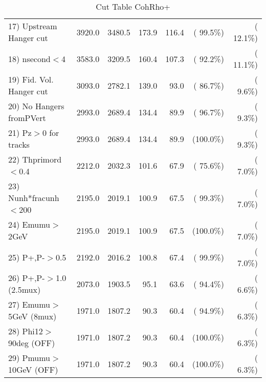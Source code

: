 \begin{table}[h!]
\begin{tabular}{||l||r|r|r|r|r|r||}
 17) Upstream Hanger cut  &       3920.0 &       3480.5 &        173.9 &        116.4 & ( 99.5\%) & ( 12.1\%) \\
 18) nsecond$<$4          &       3583.0 &       3209.5 &        160.4 &        107.3 & ( 92.2\%) & ( 11.1\%) \\
 19) Fid. Vol. Hanger cut &       3093.0 &       2782.1 &        139.0 &         93.0 & ( 86.7\%) & (  9.6\%) \\
 20) No Hangers fromPVert &       2993.0 &       2689.4 &        134.4 &         89.9 & ( 96.7\%) & (  9.3\%) \\
 21) Pz$>$0 for tracks    &       2993.0 &       2689.4 &        134.4 &         89.9 & (100.0\%) & (  9.3\%) \\
 22) Thprimord$<$0.4      &       2212.0 &       2032.3 &        101.6 &         67.9 & ( 75.6\%) & (  7.0\%) \\
 23) Nunh*fracunh$<$200   &       2195.0 &       2019.1 &        100.9 &         67.5 & ( 99.3\%) & (  7.0\%) \\
 24) Emumu$>$2GeV         &       2195.0 &       2019.1 &        100.9 &         67.5 & (100.0\%) & (  7.0\%) \\
 25) P+,P-$>$0.5          &       2192.0 &       2016.2 &        100.8 &         67.4 & ( 99.9\%) & (  7.0\%) \\
 26) P+,P-$>$1.0 (2.5mux) &       2073.0 &       1903.5 &         95.1 &         63.6 & ( 94.4\%) & (  6.6\%) \\
 27) Emumu$>$5GeV  (8mux) &       1971.0 &       1807.2 &         90.3 &         60.4 & ( 94.9\%) & (  6.3\%) \\
 28) Phi12$>$90deg  (OFF) &       1971.0 &       1807.2 &         90.3 &         60.4 & (100.0\%) & (  6.3\%) \\
 29) Pmumu$>$10GeV  (OFF) &       1971.0 &       1807.2 &         90.3 &         60.4 & (100.0\%) & (  6.3\%) \\
 \hline
 \hline
 \end{tabular}
 \caption{Cut Table  CohRho+  }
 \label{tab-cutcohjpsi-mumu_cohrhop}
 \end{table}
